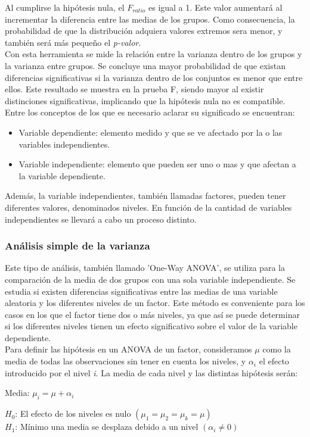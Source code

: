 Al cumplirse la hipótesis nula, el $F_{ratio}$  es igual a 1. Este valor aumentará al incrementar la diferencia entre las medias de los grupos. Como consecuencia, la probabilidad de que la distribución adquiera valores extremos sera menor, y también será más pequeño el \textit{p-valor}. \\

Con esta herramienta se mide la relación entre la varianza dentro de los grupos y la varianza entre grupos. Se concluye una mayor probabilidad de que existan diferencias significativas si la varianza dentro de los conjuntos es menor que entre ellos. Este resultado se muestra en la prueba F, siendo mayor al existir distinciones significativas, implicando que la hipótesis nula no es compatible.\\

Entre los conceptos de los que es necesario aclarar su significado se encuentran: 
\begin{itemize}
	
	\item Variable dependiente: elemento medido y que se ve afectado por la o las variables independientes.
	\item Variable independiente: elemento que pueden ser uno o mas y que afectan a la variable dependiente.
\end{itemize}

Además, la variable independientes, también llamadas factores, pueden tener diferentes valores, denominados niveles. En función de la cantidad de variables independientes se llevará a cabo un proceso distinto.

\subsubsection{Análisis simple de la varianza}
Este tipo de análisis, también llamado 'One-Way ANOVA', se utiliza para la comparación de la media de dos grupos con una sola variable independiente. Se estudia si existen diferencias significativas entre las medias de una variable aleatoria y los diferentes niveles de un factor. Este método es conveniente para los casos en los que el factor tiene dos o más niveles, ya que así se puede determinar si los diferentes niveles tienen un efecto significativo sobre el valor de la variable dependiente.\\

Para definir las hipótesis en un ANOVA de un factor, consideramos $\mu$ como la media de todas las observaciones sin tener en cuenta los niveles, y $\alpha_{i}$ el efecto introducido por el nivel \textit{i}. La media de cada nivel y las distintas hipótesis serán: 
\begin{center}
	Media: $\mu_{i} = \mu + \alpha_{i} $

$H_{0}$: El efecto de los niveles es nulo $(\mu_{1} = \mu_{2} = \mu_{k} = \mu)$\\
$H_{1}$: Mínimo una media se desplaza debido a un nivel $(\alpha_{i} \neq 0)$
\end{center}

